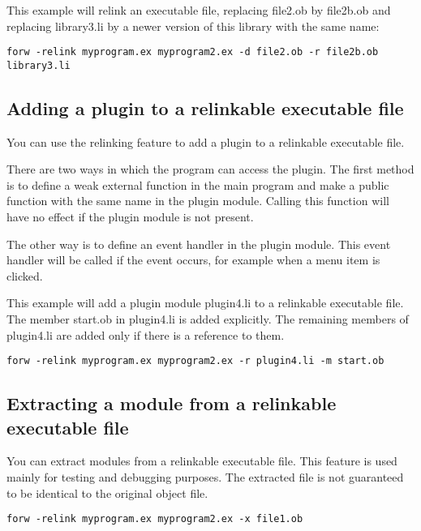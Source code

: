 \documentclass[forwardcom.tex]{subfiles}
\begin{document}
This example will relink an executable file, replacing file2.ob by file2b.ob and replacing library3.li by a newer version of this library with the same name:
\begin{lstlisting}[frame=single]
forw -relink myprogram.ex myprogram2.ex -d file2.ob -r file2b.ob library3.li
\end{lstlisting}
\vspace{4mm}

\subsection{Adding a plugin to a relinkable executable file} \label{AddingAPlugin}
You can use the relinking feature to add a plugin to a relinkable executable file.
\vv

There are two ways in which the program can access the plugin. The first method is to define a weak external function in the main program and make a public function with the same name in the plugin module. Calling this function will have no effect if the plugin module is not present.
\vv

The other way is to define an event handler in the plugin module. This event handler will be called if the event occurs, for example when a menu item is clicked.
\vv

This example will add a plugin module plugin4.li to a relinkable executable file. The member start.ob in plugin4.li is added explicitly. The remaining members of plugin4.li are added only if there is a reference to them.
\begin{lstlisting}[frame=single]
forw -relink myprogram.ex myprogram2.ex -r plugin4.li -m start.ob
\end{lstlisting}
\vspace{4mm}

\subsection{Extracting a module from a relinkable executable file} \label{ExtractingFromRelinkable}
You can extract modules from a relinkable executable file. This feature is used mainly for testing and debugging purposes. The extracted file is not guaranteed to be identical to the original object file.
\vv

\begin{lstlisting}[frame=single]
forw -relink myprogram.ex myprogram2.ex -x file1.ob
\end{lstlisting}
\vspace{4mm}
\end{document}
